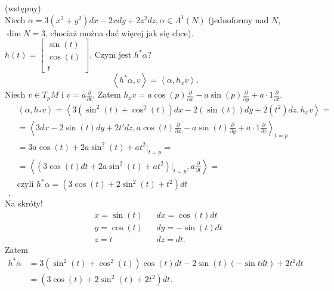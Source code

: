\documentclass[../main.tex]{subfiles}
\begin{document}
    \begin{figure}[h]
        \centering
        \label{fig:fig_59}
    \end{figure}
    \pagebreak
    \begin{przyklad}
        (wstępny)\\
        Niech $\alpha = 3(x^2+y^2)dx - 2xdy + 2z^2dz, \alpha\in \Lambda^1(N)$ (jednoformy nad $N$, $\dim N = 3$, chociaż można dać więcej jak się chce).\\
        $h(t) = \begin{bmatrix} \sin(t)\\ \cos(t)\\ t \end{bmatrix} $. Czym jest $h^*\alpha$?\\
        \[
        \left<h^*\alpha,v \right> = \left<\alpha,h_xv \right>
        .\]
        Niech $v\in T_pM$ i  $v = a \frac{\partial }{\partial t} $. Zatem $h_x v = a \cos(p) \frac{\partial }{\partial x} - a \sin(p) \frac{\partial }{\partial y} + a\cdot 1 \frac{\partial }{\partial t} $.
        \begin{align*}
            &\left<\alpha,h_*v \right> = \left< 3 \left( \sin^2(t) + \cos^2(t)\right) dx - 2\left( \sin(t) \right) dy + 2\left( t^2 \right) dz, h_xv\right> =\\
            &= \left<3dx - 2\sin(t)dy + 2t'dz, a \cos(t) \frac{\partial }{\partial x} - a \sin(t) \frac{\partial }{\partial y} + a\cdot 1 \frac{\partial }{\partial z}  \right>_{t=p} \\
            &= 3a \cos(t) + 2a \sin^2(t) + at^2 \vert_{t=p} = \\
            &= \left< \left(3\cos(t)dt + 2a\sin^2(t) + at^2\right)\vert_{t=p}, a \frac{\partial }{\partial t}  \right> = \\
            & \text{czyli } h^*\alpha = \left( 3\cos(t) + 2 \sin^2(t) + t^2 \right) dt \\
        .\end{align*}
        Na skróty!\\
        \begin{align*}
            &x = \sin(t) &&dx = \cos(t)dt\\
            &y = \cos(t) &&dy = -\sin(t) dt\\
            &z = t &&dz = dt
        .\end{align*}
        Zatem
         \begin{align*}
             h^*\alpha &= 3\left( \sin^2(t) + \cos^2(t) \right) \cos(t)dt - 2\sin(t) \left( -\sin t dt \right) + 2t^2dt \\
                       &= \left( 3\cos(t) + 2\sin^2(t) + 2t^2 \right) dt
        .\end{align*}
    \end{przyklad}
\end{document}

